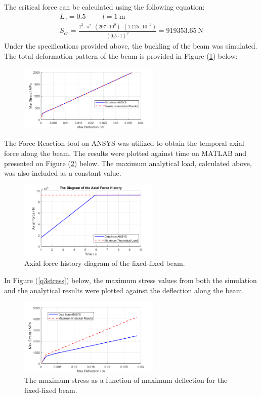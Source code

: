 \documentclass[11pt]{article}
\begin{document}
The critical force can be calculated using the following equation:
\begin{gather}
    L_e = 0.5 \hspace{1cm} l = \SI{1}{\meter}\\
    S_{cr} = \frac{1^2 \cdot \pi^2 \cdot\left(207\cdot10^9\right)\cdot\left(1.125\cdot 10^{-7}\right)}{(0.5\cdot 1)^2} = \SI{919353.65}{\newton}
\end{gather}
Under the specifications provided above, the buckling of the beam was simulated. The total deformation pattern of the beam is provided in Figure (\ref{q5ss}) below:
\begin{figure}[H]
    \centering
    \includegraphics[width=0.6\textwidth]{q3def.png}
    \caption{}
    \label{q5ss}
\end{figure}
The Force Reaction tool on ANSYS was utilized to obtain the temporal axial force along the beam. The results were plotted against time on MATLAB and presented on Figure (\ref{q5axial}) below. The maximum analytical load, calculated above, was also included as a constant value.
\begin{figure}[H]
    \centering
    \includegraphics[width=0.6\textwidth]{q5axial.png}
    \caption{Axial force history diagram of the fixed-fixed beam.}
    \label{q5axial}
\end{figure}
In Figure (\ref{q3stress}) below, the maximum stress values from both the simulation and the analytical results were plotted against the deflection along the beam.
\begin{figure}[H]
    \centering
    \includegraphics[width=0.6\textwidth]{q5def.png}
    \caption{The maximum stress as a function of maximum deflection for the fixed-fixed beam.}
    \label{q5stress}
\end{figure}
\end{document}
